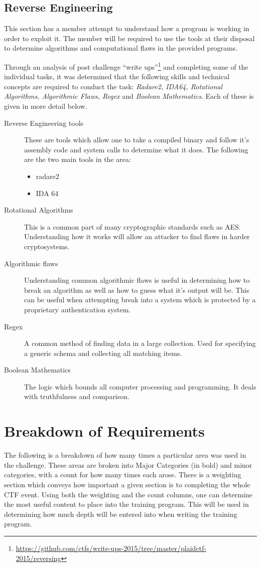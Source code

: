 \documentclass[a4paper,11pt]{report}
\begin{document}
		\subsection{Reverse Engineering}
			This section has a member attempt to understand how a program is working in order to exploit it. 
			The member will be required to use the tools at their disposal to determine algorithms and computational flaws in the provided programs. 

			Through an analysis of post challenge ``write ups''\footnote{\url{https://github.com/ctfs/write-ups-2015/tree/master/plaidctf-2015/reversing}}
			and completing some of the individual tasks, 
			it was determined that the following skills and technical concepts are required to conduct the task: 
			\textit{Radare2, IDA64, Rotational Algorithms, Algorithmic Flaws, Regex} and \textit{Boolean Mathematics}.
			Each of these is given in more detail below. 
			\begin{description}
				\item[Reverse Engineering tools] 
					These are tools which allow one to take a compiled binary and follow it's assembly code and system calls to determine what it does. 
					The following are the two main tools in the area:
					\begin{itemize}
						\item radare2
						\item IDA 64
					\end{itemize}
				\item[Rotational Algorithms]
					This is a common part of many cryptographic standards such as AES. 
					Understanding how it works will allow an attacker to find flaws in harder cryptosystems.
				\item[Algorithmic flaws] 
					Understanding common algorithmic flaws is useful in determining how to break an algorithm as well as how to guess what it's output will be. 
					This can be useful when attempting break into a system which is protected by a proprietary authentication system. 
				\item[Regex]
					A common method of finding data in a large collection. 
					Used for specifying a generic schema and collecting all matching items. 
				\item[Boolean Mathematics] 
					The logic which bounds all computer processing and programming. 
					It deals with truthfulness and comparison. 
			\end{description}
	
	\section{Breakdown of Requirements}
	 	The following is a breakdown of how many times a particular area was used in the challenge. 
		These areas are broken into Major Categories (in bold) and minor categories, with a count for how many times each arose. 
		There is a weighting section which conveys how important a given section is to completing the whole CTF event. 
		Using both the weighting and the count columns, one can determine the most useful content to place into the training program. 
		This will be used in determining how much depth will be entered into when writing the training program.
\end{document}
